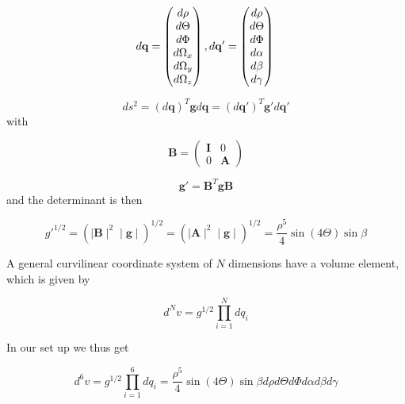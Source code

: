 \documentclass{article}
\numberwithin{equation}{section}
\numberwithin{figure}{section}
\begin{document}
\begin{equation}
d\mathbf{q} =
\begin{pmatrix}
d\rho\\
d\Theta\\
d\Phi\\
d\Omega_x\\
d\Omega_y\\
d\Omega_z\\
\end{pmatrix},
d\mathbf{q}' =
\begin{pmatrix}
d\rho\\
d\Theta\\
d\Phi\\
d\alpha\\
d\beta\\
d\gamma\\
\end{pmatrix} \notag \\
\end{equation}

\begin{equation}
ds^2 = (d\mathbf{q})^T\mathbf{g}d\mathbf{q} = (d\mathbf{q}')^T\mathbf{g}'d\mathbf{q}'
\end{equation}
with

\begin{equation}
\mathbf{B} = 
\begin{pmatrix}
\mathbf{I} & 0\\
0      & \mathbf{A}
\end{pmatrix}
\end{equation}

\begin{equation}
\mathbf{g}'=\mathbf{B}^T\mathbf{g}\mathbf{B}
\end{equation}
and the determinant is then

\begin{equation}
g'^{1/2}=(\mid\mathbf{B}\mid^2 \mid\mathbf{g}\mid)^{1/2} = (\mid\mathbf{A}\mid^2 \mid\mathbf{g}\mid)^{1/2}
= \frac{\rho^5}{4}\sin(4\Theta)\sin\beta
\end{equation}

A general curvilinear coordinate system of $N$ dimensions have a volume element, which is given by

\begin{equation}
d^Nv = g^{1/2}\prod_{i=1}^{N} dq_i
\end{equation}

In our set up we thus get 

\begin{equation}
d^6v = g^{1/2}\prod_{i=1}^{6} dq_i = \frac{\rho^5}{4}\sin(4\Theta)\sin\beta d\rho d\Theta d\Phi d\alpha d\beta d\gamma
\end{equation}
\end{document}

